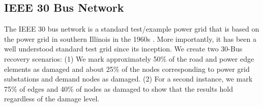 \documentclass[10pt]{article}
\begin{document}
\subsection{IEEE 30 Bus Network}
 \vspace*{-12pt}
The IEEE 30 bus network is a standard test/example power grid that is based on the power grid in southern Illinois in the 1960s . More importantly, it has been a well understood standard test grid since its inception. We create two 30-Bus recovery scenarios: (1) We mark approximately 50\% of the road and power edge elements as damaged and about 25\% of the nodes corresponding to power grid substations and demand nodes as damaged. (2) For a second instance, we mark 75\% of edges and 40\% of nodes as damaged to show that the results hold regardless of the damage level.

	
\end{document}
